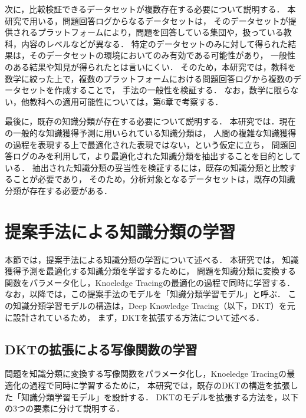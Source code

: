 次に，比較検証できるデータセットが複数存在する必要について説明する．
本研究で用いる，問題回答ログからなるデータセットは，
そのデータセットが提供されるプラットフォームにより，問題を回答している集団や，扱っている教科，内容のレベルなどが異なる．
特定のデータセットのみに対して得られた結果は，そのデータセットの環境においてのみ有効である可能性があり，
一般性のある結果や知見が得られたとは言いにくい．
そのため，本研究では，教科を数学に絞った上で，複数のプラットフォームにおける問題回答ログから複数のデータセットを作成することで，
手法の一般性を検証する．
なお，数学に限らない，他教科への適用可能性については，第6章で考察する．


最後に，既存の知識分類が存在する必要について説明する．
本研究では．現在の一般的な知識獲得予測に用いられている知識分類は，
人間の複雑な知識獲得の過程を表現する上で最適化された表現ではない，という仮定に立ち，
問題回答ログのみを利用して，より最適化された知識分類を抽出することを目的としている．
抽出された知識分類の妥当性を検証するには，既存の知識分類と比較することが必要であり，
そのため，分析対象となるデータセットは，既存の知識分類が存在する必要がある．





\section{提案手法による知識分類の学習}
本節では，提案手法による知識分類の学習について述べる．
本研究では，
知識獲得予測を最適化する知識分類を学習するために，
問題を知識分類に変換する関数をパラメータ化し，Knoeledge Tracingの最適化の過程で同時に学習する．
なお，以降では，この提案手法のモデルを「知識分類学習モデル」と呼ぶ．
この知識分類学習モデルの構造は，Deep Knowledge Tracing（以下，DKT）を元に設計されているため，
まず，DKTを拡張する方法について述べる．



\subsection{DKTの拡張による写像関数の学習}
\label{sec:tag_learn}

問題を知識分類に変換する写像関数をパラメータ化し，Knoeledge Tracingの最適化の過程で同時に学習するために，
本研究では，既存のDKTの構造を拡張した「知識分類学習モデル」を設計する．
DKTのモデルを拡張する方法を，以下の3つの要素に分けて説明する．

